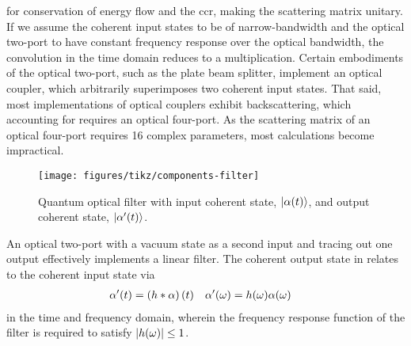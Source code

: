 for conservation of energy flow and the \gls{ccr}, making the scattering matrix unitary.
If we assume the coherent input states to be of narrow-bandwidth and the optical two-port to have constant frequency response over the optical bandwidth, the convolution in the time domain reduces to a multiplication.
Certain embodiments of the optical two-port, such as the plate beam splitter, implement an optical coupler, which arbitrarily superimposes two coherent input states.
That said, most implementations of optical couplers exhibit backscattering, which accounting for requires an optical four-port.
As the scattering matrix of an optical four-port requires \num{16} complex parameters, most calculations become impractical.
\begin{figure}[htb]
    \centering
    \texttt{[image: figures/tikz/components-filter]}
    \caption{Quantum optical filter with input coherent state, $\lvert\alpha(t)\rangle$, and output coherent state, $\lvert\alpha^\prime(t)\rangle$.}\label{fig:components_filter}
\end{figure}
An optical two-port with a vacuum state as a second input and tracing out one output effectively implements a linear filter.
The coherent output state in  relates to the coherent input state via
\begin{align*}
	\alpha^\prime(t)
	&=
	\left(h\ast\alpha\right)(t)
	&
	\alpha^\prime(\omega)
	&=
	h(\omega)
	\alpha(\omega)
\end{align*}
in the time and frequency domain, wherein the frequency response function of the filter is required to satisfy $\lvert h(\omega)\rvert\leq1$.

